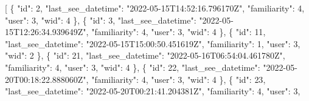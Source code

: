 \documentclass[
]{article}
\newenvironment{Shaded}{}{}
\newcommand{\DataTypeTok}[1]{\textcolor[rgb]{0.56,0.13,0.00}{#1}}
\newcommand{\DecValTok}[1]{\textcolor[rgb]{0.25,0.63,0.44}{#1}}
\newcommand{\FunctionTok}[1]{\textcolor[rgb]{0.02,0.16,0.49}{#1}}
\newcommand{\OtherTok}[1]{\textcolor[rgb]{0.00,0.44,0.13}{#1}}
\newcommand{\StringTok}[1]{\textcolor[rgb]{0.25,0.44,0.63}{#1}}
\begin{document}
\begin{Shaded}
\begin{Highlighting}[]
\OtherTok{[}
  \FunctionTok{\{}
    \DataTypeTok{"id"}\FunctionTok{:} \DecValTok{2}\FunctionTok{,}
    \DataTypeTok{"last\_see\_datetime"}\FunctionTok{:} \StringTok{"2022{-}05{-}15T14:52:16.796170Z"}\FunctionTok{,}
    \DataTypeTok{"familiarity"}\FunctionTok{:} \DecValTok{4}\FunctionTok{,}
    \DataTypeTok{"user"}\FunctionTok{:} \DecValTok{3}\FunctionTok{,}
    \DataTypeTok{"wid"}\FunctionTok{:} \DecValTok{4}
  \FunctionTok{\}}\OtherTok{,}
  \FunctionTok{\{}
    \DataTypeTok{"id"}\FunctionTok{:} \DecValTok{3}\FunctionTok{,}
    \DataTypeTok{"last\_see\_datetime"}\FunctionTok{:} \StringTok{"2022{-}05{-}15T12:26:34.939649Z"}\FunctionTok{,}
    \DataTypeTok{"familiarity"}\FunctionTok{:} \DecValTok{4}\FunctionTok{,}
    \DataTypeTok{"user"}\FunctionTok{:} \DecValTok{3}\FunctionTok{,}
    \DataTypeTok{"wid"}\FunctionTok{:} \DecValTok{4}
  \FunctionTok{\}}\OtherTok{,}
  \FunctionTok{\{}
    \DataTypeTok{"id"}\FunctionTok{:} \DecValTok{11}\FunctionTok{,}
    \DataTypeTok{"last\_see\_datetime"}\FunctionTok{:} \StringTok{"2022{-}05{-}15T15:00:50.451619Z"}\FunctionTok{,}
    \DataTypeTok{"familiarity"}\FunctionTok{:} \DecValTok{1}\FunctionTok{,}
    \DataTypeTok{"user"}\FunctionTok{:} \DecValTok{3}\FunctionTok{,}
    \DataTypeTok{"wid"}\FunctionTok{:} \DecValTok{2}
  \FunctionTok{\}}\OtherTok{,}
  \FunctionTok{\{}
    \DataTypeTok{"id"}\FunctionTok{:} \DecValTok{21}\FunctionTok{,}
    \DataTypeTok{"last\_see\_datetime"}\FunctionTok{:} \StringTok{"2022{-}05{-}16T06:54:04.461780Z"}\FunctionTok{,}
    \DataTypeTok{"familiarity"}\FunctionTok{:} \DecValTok{4}\FunctionTok{,}
    \DataTypeTok{"user"}\FunctionTok{:} \DecValTok{3}\FunctionTok{,}
    \DataTypeTok{"wid"}\FunctionTok{:} \DecValTok{4}
  \FunctionTok{\}}\OtherTok{,}
  \FunctionTok{\{}
    \DataTypeTok{"id"}\FunctionTok{:} \DecValTok{22}\FunctionTok{,}
    \DataTypeTok{"last\_see\_datetime"}\FunctionTok{:} \StringTok{"2022{-}05{-}20T00:18:22.888060Z"}\FunctionTok{,}
    \DataTypeTok{"familiarity"}\FunctionTok{:} \DecValTok{4}\FunctionTok{,}
    \DataTypeTok{"user"}\FunctionTok{:} \DecValTok{3}\FunctionTok{,}
    \DataTypeTok{"wid"}\FunctionTok{:} \DecValTok{4}
  \FunctionTok{\}}\OtherTok{,}
  \FunctionTok{\{}
    \DataTypeTok{"id"}\FunctionTok{:} \DecValTok{23}\FunctionTok{,}
    \DataTypeTok{"last\_see\_datetime"}\FunctionTok{:} \StringTok{"2022{-}05{-}20T00:21:41.204381Z"}\FunctionTok{,}
    \DataTypeTok{"familiarity"}\FunctionTok{:} \DecValTok{4}\FunctionTok{,}
    \DataTypeTok{"user"}\FunctionTok{:} \DecValTok{3}\FunctionTok{,}

\end{Highlighting}
\end{Shaded}
\end{document}
